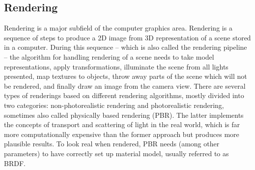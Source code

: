     \subsection{Rendering}
    Rendering is a major subfield of the computer graphics area. Rendering is a sequence of steps to produce a 2D image from 3D representation of a scene stored in a computer. During this sequence -- which is also called the rendering pipeline -- the algorithm for handling rendering of a scene needs to take model representations, apply transformations, illuminate the scene from all lights presented, map textures to objects, throw away parts of the scene which will not be rendered, and finally draw an image from the camera view. There are several types of renderings based on different rendering algorithms, mostly divided into two categories: non-photorealistic rendering and photorealistic rendering, sometimes also called physically based rendering (PBR). The latter implements the concepts of transport and scattering of light in the real world, which is far more computationally expensive than the former approach but produces more plausible results. To look real when rendered, PBR needs (among other parameters) to have correctly set up material model, usually referred to as BRDF.
